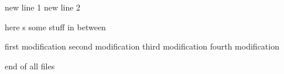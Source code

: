new line 1
new line 2


here s some stuff in between

first modification
second modification
third modification
fourth modification

end of all files
